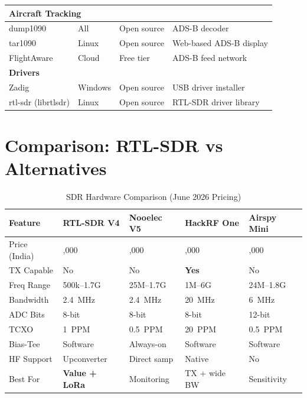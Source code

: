 \documentclass[12pt,a4paper]{article}
\begin{document}
\begin{table}[h!]
\begin{tabular}{@{}lllp{3.5cm}@{}}
\midrule
\multicolumn{4}{l}{\textbf{Aircraft Tracking}} \\
\midrule
dump1090 & All & Open source & ADS-B decoder \\
tar1090 & Linux & Open source & Web-based ADS-B display \\
FlightAware & Cloud & Free tier & ADS-B feed network \\

\midrule
\multicolumn{4}{l}{\textbf{Drivers}} \\
\midrule
Zadig & Windows & Open source & USB driver installer \\
rtl-sdr (librtlsdr) & Linux & Open source & RTL-SDR driver library \\
\bottomrule
\end{tabular}
\end{table}

\section{Comparison: RTL-SDR vs Alternatives}

\begin{table}[h!]
\centering
\caption{SDR Hardware Comparison (June 2026 Pricing)}
\begin{tabular}{@{}lllll@{}}
\toprule
\textbf{Feature} & \textbf{RTL-SDR V4} & \textbf{Nooelec V5} & \textbf{HackRF One} & \textbf{Airspy Mini} \\
\midrule
Price (India) & \rupee 6,000 & \rupee 5,000 & \rupee 35,000 & \rupee 15,000 \\
TX Capable & No & No & \textbf{Yes} & No \\
Freq Range & 500k--1.7G & 25M--1.7G & 1M--6G & 24M--1.8G \\
Bandwidth & 2.4~MHz & 2.4~MHz & 20~MHz & 6~MHz \\
ADC Bits & 8-bit & 8-bit & 8-bit & 12-bit \\
TCXO & 1~PPM & 0.5~PPM & 20~PPM & 0.5~PPM \\
Bias-Tee & Software & Always-on & Software & Software \\
HF Support & Upconverter & Direct samp & Native & No \\
Best For & \textbf{Value + LoRa} & Monitoring & TX + wide BW & Sensitivity \\
\bottomrule
\end{tabular}
\end{table}
\end{document}
